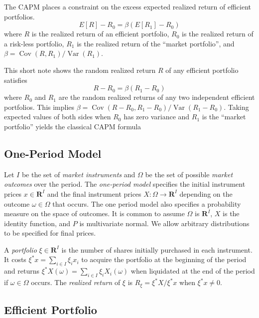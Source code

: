 The CAPM places a constraint on the excess expected realized return of
efficient portfolios. \[
\tag{1} E[R] - R_0 = \beta(E[R_1] - R_0)
\] where \(R\) is the realized return of an efficient portfolio, \(R_0\)
is the realized return of a risk-less portfolio, \(R_1\) is the realized
return of the ``market portfolio'', and
\(\beta = \operatorname{Cov}(R, R_1)/\operatorname{Var}(R_1)\).

This short note shows the random realized return \(R\) of any efficient
portfolio satisfies \[
\tag{2} R - R_0 = \beta(R_1 - R_0)
\] where \(R_0\) and \(R_1\) are the random realized returns of any two
independent efficient portfolios. This implies
\(\beta = \operatorname{Cov}(R - R_0, R_1 - R_0)/\operatorname{Var}(R_1 - R_0)\).
Taking expected values of both sides when \(R_0\) has zero variance and
\(R_1\) is the ``market portfolio'' yields the classical CAPM formula

\subsection{One-Period Model}\label{one-period-model}

Let \(I\) be the set of \emph{market instruments} and \(\Omega\) be the
set of possible \emph{market outcomes} over the period. The
\emph{one-period model} specifies the initial instrument prices
\(x\in\mathbf{R}^I\) and the final instrument prices
\(X\colon\Omega\to\mathbf{R}^I\) depending on the outcome
\(\omega\in\Omega\) that occurs. The one period model also specifies a
probability measure on the space of outcomes. It is common to assume
\(\Omega\) is \(\mathbf{R}^I\), \(X\) is the identity function, and
\(P\) is multivariate normal. We allow arbitrary distributions to be
specified for final prices.

A \emph{portfolio} \(\xi\in\mathbf{R}^I\) is the number of shares
initially purchased in each instrument. It costs
\({\xi^* x = \sum_{i\in I} \xi_i x_i}\) to acquire the portfolio at the
beginning of the period and returns
\({\xi^* X(\omega) = \sum_{i\in I} \xi_i X_i(\omega)}\) when liquidated
at the end of the period if \(\omega\in\Omega\) occurs. The
\emph{realized return} of \(\xi\) is \({R_\xi = \xi^* X/\xi^* x}\) when
\(\xi^* x \not= 0\).

\subsection{Efficient Portfolio}\label{efficient-portfolio}

